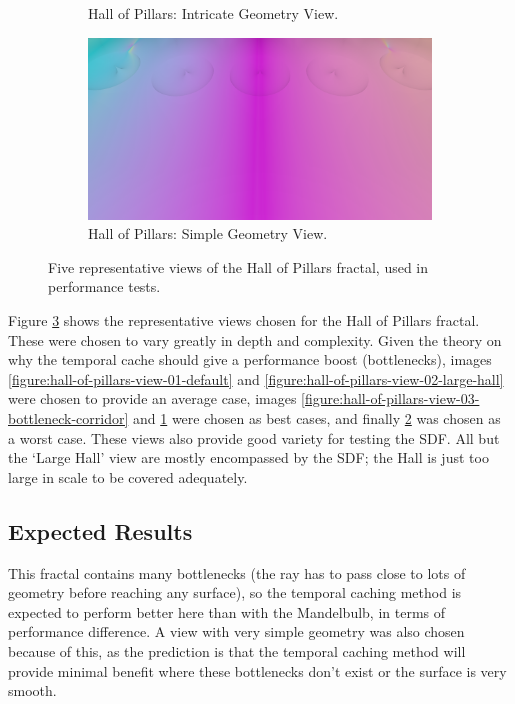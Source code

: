 \begin{figure}[ht]
\begin{subfigure}[c]{0.3\linewidth}
		\caption{Hall of Pillars: Intricate Geometry View.}
		\label{figure:hall-of-pillars-view-04-intricate-geometry}
	\end{subfigure}
	\hfill
	\begin{subfigure}[c]{0.3\linewidth}
		\includegraphics[width=\linewidth, frame]{Images/Results/Hall-Of-Pillars-View-05-Simple-Geometry.png}
		\caption{Hall of Pillars: Simple Geometry View.}
		\label{figure:hall-of-pillars-view-05-simple-geometry}
	\end{subfigure}

	\caption{Five representative views of the Hall of Pillars fractal, used in performance tests.}
	\label{figure:hall-of-pillars-views}
\end{figure}

Figure \ref{figure:hall-of-pillars-views} shows the representative views chosen for the Hall of Pillars fractal. These were chosen to vary greatly in depth and complexity. Given the theory on why the temporal cache should give a performance boost (bottlenecks), images \ref{figure:hall-of-pillars-view-01-default} and \ref{figure:hall-of-pillars-view-02-large-hall} were chosen to provide an average case, images \ref{figure:hall-of-pillars-view-03-bottleneck-corridor} and \ref{figure:hall-of-pillars-view-04-intricate-geometry} were chosen as best cases, and finally \ref{figure:hall-of-pillars-view-05-simple-geometry} was chosen as a worst case. These views also provide good variety for testing the SDF. All but the `Large Hall' view are mostly encompassed by the SDF; the Hall is just too large in scale to be covered adequately.

\subsection{Expected Results}

This fractal contains many bottlenecks (the ray has to pass close to lots of geometry before reaching any surface), so the temporal caching method is expected to perform better here than with the Mandelbulb, in terms of performance difference. A view with very simple geometry was also chosen because of this, as the prediction is that the temporal caching method will provide minimal benefit where these bottlenecks don't exist or the surface is very smooth.\newline

